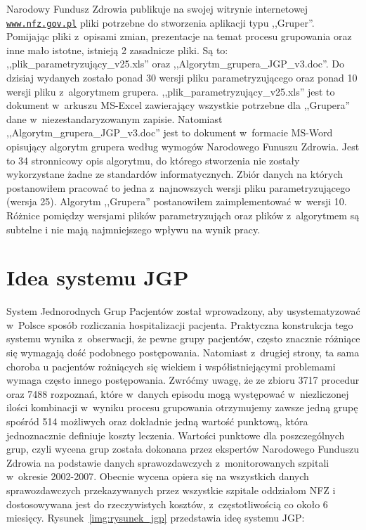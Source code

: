 Narodowy Fundusz Zdrowia publikuje na swojej witrynie internetowej \underline{\texttt{www.nfz.gov.pl}} pliki potrzebne do stworzenia aplikacji typu ,,Gruper''. Pomijając pliki z~opisami zmian, prezentacje na temat procesu grupowania oraz inne mało istotne, istnieją 2 zasadnicze pliki. Są to: ,,plik\_parametryzujący\_v25.xls'' oraz ,,Algorytm\_grupera\_JGP\_v3.doc''. Do dzisiaj wydanych zostało ponad 30 wersji pliku parametryzującego oraz ponad 10 wersji pliku z~algorytmem grupera.
,,plik\_parametryzujący\_v25.xls'' jest to dokument w~arkuszu MS-Excel zawierający wszystkie potrzebne dla ,,Grupera'' dane w~niezestandaryzowanym zapisie. Natomiast ,,Algorytm\_grupera\_JGP\_v3.doc'' jest to dokument w~formacie MS-Word opisujący algorytm grupera według wymogów Narodowego Funuszu Zdrowia. Jest to 34 stronnicowy opis algorytmu, do którego stworzenia nie zostały wykorzystane żadne ze standardów informatycznych. Zbiór danych na których postanowiłem pracować to jedna z~najnowszych wersji pliku parametryzującego (wersja 25). Algorytm ,,Grupera'' postanowiłem zaimplementować w~wersji 10. Różnice pomiędzy wersjami plików parametryzująch oraz plików z~algorytmem są subtelne i nie mają najmniejszego wpływu na wynik pracy.


\section{Idea systemu JGP}
\label{sec:ideaSystemuJGP}

System Jednorodnych Grup Pacjentów został wprowadzony, aby usystematyzować w~Polsce sposób rozliczania hospitalizacji pacjenta. Praktyczna konstrukcja tego systemu wynika z~obserwacji, że pewne grupy pacjentów, często znacznie różniące się wymagają dość podobnego postępowania. Natomiast z~drugiej strony, ta sama choroba u pacjentów rożniących się wiekiem i współistniejącymi problemami wymaga często innego postępowania.
Zwróćmy uwagę, że ze zbioru 3717 procedur oraz 7488 rozpoznań, które w~danych episodu mogą występować w~niezliczonej ilości kombinacji w~wyniku procesu grupowania otrzymujemy zawsze jedną grupę spośród 514 możliwych oraz dokładnie jedną wartość punktową, która jednoznacznie definiuje koszty leczenia.
Wartości punktowe dla poszczególnych grup, czyli wycena grup została dokonana przez ekspertów Narodowego Funduszu Zdrowia na podstawie danych sprawozdawczych z~monitorowanych szpitali w~okresie 2002-2007. Obecnie wycena opiera się na wszystkich danych sprawozdawczych przekazywanych przez wszystkie szpitale oddziałom NFZ i dostosowywana jest do rzeczywistych kosztów, z~częstotliwością co około 6 miesięcy.
Rysunek~\ref{img:rysunek_jgp} przedstawia ideę systemu JGP:

